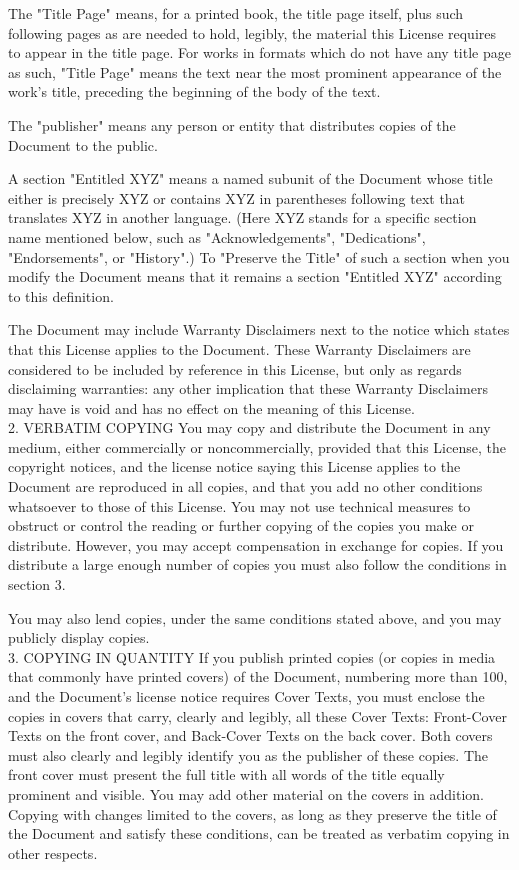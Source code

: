 \documentclass[10pt,a4paper]{article}
\begin{document}
\begin{scriptsize}
The "Title Page" means, for a printed book, the title page itself, plus such following pages as are needed to hold, legibly, the material this License requires to appear in the title page. For works in formats which do not have any title page as such, "Title Page" means the text near the most prominent appearance of the work's title, preceding the beginning of the body of the text.

The "publisher" means any person or entity that distributes copies of the Document to the public.

A section "Entitled XYZ" means a named subunit of the Document whose title either is precisely XYZ or contains XYZ in parentheses following text that translates XYZ in another language. (Here XYZ stands for a specific section name mentioned below, such as "Acknowledgements", "Dedications", "Endorsements", or "History".) To "Preserve the Title" of such a section when you modify the Document means that it remains a section "Entitled XYZ" according to this definition.

The Document may include Warranty Disclaimers next to the notice which states that this License applies to the Document. These Warranty Disclaimers are considered to be included by reference in this License, but only as regards disclaiming warranties: any other implication that these Warranty Disclaimers may have is void and has no effect on the meaning of this License.\\

2. VERBATIM COPYING
You may copy and distribute the Document in any medium, either commercially or noncommercially, provided that this License, the copyright notices, and the license notice saying this License applies to the Document are reproduced in all copies, and that you add no other conditions whatsoever to those of this License. You may not use technical measures to obstruct or control the reading or further copying of the copies you make or distribute. However, you may accept compensation in exchange for copies. If you distribute a large enough number of copies you must also follow the conditions in section 3.

You may also lend copies, under the same conditions stated above, and you may publicly display copies.\\

3. COPYING IN QUANTITY
If you publish printed copies (or copies in media that commonly have printed covers) of the Document, numbering more than 100, and the Document's license notice requires Cover Texts, you must enclose the copies in covers that carry, clearly and legibly, all these Cover Texts: Front-Cover Texts on the front cover, and Back-Cover Texts on the back cover. Both covers must also clearly and legibly identify you as the publisher of these copies. The front cover must present the full title with all words of the title equally prominent and visible. You may add other material on the covers in addition. Copying with changes limited to the covers, as long as they preserve the title of the Document and satisfy these conditions, can be treated as verbatim copying in other respects.


\end{scriptsize}
\end{document}
